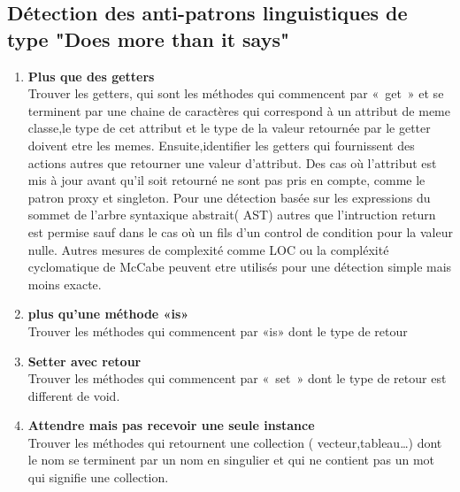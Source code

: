\subsection{Détection des anti-patrons linguistiques de type "Does more than it says"}
\begin{enumerate}
    

\item \textbf{Plus que des getters}\\
Trouver les getters, qui sont les méthodes qui commencent par « get » et se terminent par une chaine de caractères qui correspond à un attribut de meme classe,le type de cet attribut et le type de la valeur retournée par le getter doivent etre les memes. Ensuite,identifier les getters qui fournissent des actions autres que retourner une valeur d’attribut. Des cas où l’attribut est mis à jour avant qu’il soit retourné ne sont pas pris en compte, comme le patron proxy et singleton.
Pour une détection basée sur les expressions du sommet de l’arbre syntaxique abstrait( AST)  autres que l’intruction return est permise sauf dans le cas où un fils d’un control de condition pour la valeur nulle. Autres mesures de complexité comme LOC  ou la compléxité cyclomatique de McCabe peuvent etre utilisés pour une détection simple mais moins exacte.
\item \textbf{plus qu’une méthode «is»}\\
Trouver les méthodes qui commencent par «is» dont le type de retour 
\item \textbf{Setter avec retour}\\
Trouver les méthodes qui commencent par « set » dont le type de retour est different de void.
\item \textbf{Attendre mais pas recevoir une seule instance}\\
Trouver les méthodes qui retournent une collection ( vecteur,tableau…) dont le nom se terminent par un nom en singulier et qui ne contient pas un mot qui signifie une collection.
\end{enumerate}
